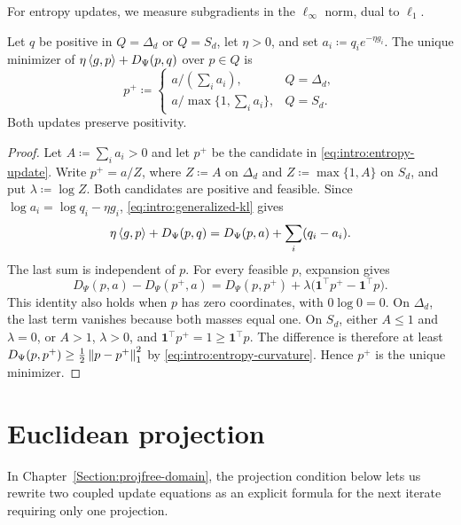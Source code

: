 For entropy updates, we measure subgradients in the $\ell_\infty$ norm,
dual to $\ell_1$.

\begin{samepage}
\begin{Thm:Lemma}\label{lem:intro:entropy-update}
\label{ch4:lem:omd-closed-form}
Let $q$ be positive in $Q=\Delta_d$ or $Q=S_d$, let $\eta>0$, and
set $a_i\coloneqq q_i e^{-\eta g_i}$. The unique minimizer of
$\eta\left\langle g,p \right\rangle+D_\Psi(p,q)$ over $p\in Q$ is
\begin{equation}\label{eq:intro:entropy-update}
 p^+\coloneqq
 \begin{cases}
 a/(\sum_i a_i),&Q=\Delta_d,\\
 a/\max\{1,\sum_i a_i\},&Q=S_d.
 \end{cases}
\end{equation}
Both updates preserve positivity.
\end{Thm:Lemma}
\end{samepage}
\begin{proof}
Let $A\coloneqq\sum_i a_i>0$ and let $p^+$ be the candidate in
\eqref{eq:intro:entropy-update}. Write $p^+=a/Z$, where $Z\coloneqq A$ on
$\Delta_d$ and $Z\coloneqq\max\{1,A\}$ on $S_d$, and put $\lambda\coloneqq\log Z$.
Both candidates are positive and feasible. Since $\log a_i=\log q_i-\eta g_i$,
\eqref{eq:intro:generalized-kl} gives
\[
 \eta\left\langle g,p \right\rangle+D_\Psi(p,q)
 =D_\Psi(p,a)+\sum_i(q_i-a_i).
\]
The last sum is independent of $p$. For every feasible $p$, expansion gives
\[
 D_\Psi(p,a)-D_\Psi(p^+,a)
 =D_\Psi(p,p^+)+\lambda\bigl(\mathbf1^\top p^+-\mathbf1^\top p\bigr).
\]
This identity also holds when $p$ has zero coordinates, with $0\log0=0$.
On $\Delta_d$, the last term vanishes because both masses equal one.
On $S_d$, either $A\le1$ and $\lambda=0$, or $A>1$, $\lambda>0$, and
$\mathbf1^\top p^+=1\ge\mathbf1^\top p$. The difference is therefore at
least $D_\Psi(p,p^+)\ge\tfrac12\left\lVert p-p^+ \right\rVert_1^2$ by
\eqref{eq:intro:entropy-curvature}. Hence $p^+$ is the unique minimizer.
\end{proof}

\section{Euclidean projection}
\label{sec:intro:projection}

In Chapter~\ref{Section:projfree-domain}, the projection condition below lets
us rewrite two coupled update equations as an explicit formula for the next
iterate requiring only one projection.

